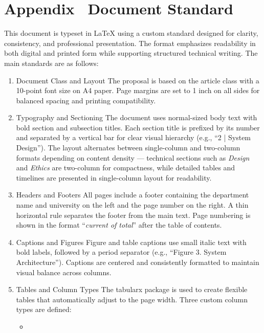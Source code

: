 \section*{Appendix \thesection \, \textbar \vspace{0.5em} Document Standard}
\label{sec:appendix-document-standard}

This document is typeset in LaTeX using a custom standard designed for clarity, consistency, and professional presentation. The format emphasizes readability in both digital and printed form while supporting structured technical writing. The main standards are as follows:
\begin{enumerate}
    \item
    Document Class and Layout
    The proposal is based on the article class with a 10-point font size on A4 paper. Page margins are set to 1 inch on all sides for balanced spacing and printing compatibility.
    \item
    Typography and Sectioning
    The document uses normal-sized body text with bold section and subsection titles. Each section title is prefixed by its number and separated by a vertical bar for clear visual hierarchy (e.g., “2 | System Design”).
    The layout alternates between single-column and two-column formats depending on content density — technical sections such as \textit{Design} and \textit{Ethics} are two-column for compactness, while detailed tables and timelines are presented in single-column layout for readability.
    \item
    Headers and Footers
    All pages include a footer containing the department name and university on the left and the page number on the right. A thin horizontal rule separates the footer from the main text. Page numbering is shown in the format “\textit{current of total}” after the table of contents.
    \item
    Captions and Figures
    Figure and table captions use small italic text with bold labels, followed by a period separator (e.g., “Figure 3. System Architecture”). Captions are centered and consistently formatted to maintain visual balance across columns.
    \item
    Tables and Column Types
    The tabularx package is used to create flexible tables that automatically adjust to the page width. Three custom column types are defined:
    \begin{itemize}
        \item

\end{itemize}
\end{enumerate}
